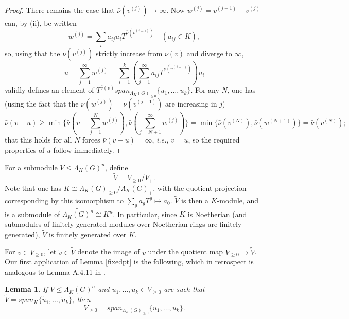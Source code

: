 \documentclass{amsart}
\theoremstyle{plain}
\newtheorem{lemma}[theorem]{Lemma}
\theoremstyle{definition}
\theoremstyle{remark}
\def\barnu{\bar{\nu}}
\begin{document}
\begin{proof}
There remains the case that $\barnu(v^{(j)})\to\infty$.    
  Now $w^{(j)}=v^{(j-1)}-v^{(j)}$
can, by (ii), be written \[ w^{(j)}=\sum_i a_{ij}u_iT^{\barnu(v^{(j-1)})}\quad (a_{ij}\in K),\] so, using that the $\barnu(v^{(j)})$ strictly increase from $\barnu(v)$ and diverge to $\infty$, \[ u=\sum_{j=1}^{\infty}w^{(j)}=\sum_{i=1}^{k}\left(\sum_{j=1}^{\infty}a_{ij}T^{\barnu(v^{(j-1)})}\right)u_i\]
validly defines an element of $T^{\barnu(v)}span_{\Lambda_K(G)_{\geq 0}}\{u_1,\ldots,u_k\}$.  For any $N$, one has (using the fact that the $\barnu(w^{(j)})=\barnu(v^{(j-1)})$ are increasing in $j$) \[ \barnu(v-u)\geq \min\{\barnu(v-\sum_{j=1}^{N}w^{(j)}),\barnu(\sum_{j=N+1}^{\infty}w^{(j)})\}=\min\{\barnu(v^{(N)}),\barnu(w^{(N+1)})\}=\barnu(v^{(N)});\] that this holds for all $N$ forces $\barnu(v-u)=\infty$, \emph{i.e.}, $v=u$, so the required properties of $u$ follow immediately.  
\end{proof}

For a submodule $V\leq \Lambda_K(G)^n$, define \[ \tilde{V}=V_{\geq 0}/V_+.\]  Note that one has $K\cong \Lambda_K(G)_{\geq 0}/\Lambda_K(G)_+$, with the quotient projection corresponding by this isomorphism to $\sum_g a_gT^g\mapsto a_0$.  $\tilde{V}$ is then a $K$-module, and is a submodule of $\widetilde{\Lambda_K(G)^n}\cong K^n$.  In particular, since $K$ is Noetherian (and submodules of finitely generated modules over Noetherian rings are finitely generated), $\tilde{V}$ is finitely generated over $K$.

For $v\in V_{\geq 0}$, let $\tilde{v}\in\tilde{V}$ denote the image of $v$ under the quotient map $V_{\geq 0}\to \tilde{V}$.  Our first application of Lemma \ref{fixedpt} is the following, which in retrospect is analogous to Lemma A.4.11 in \cite{FOOO}.

\begin{lemma} \label{span}If $V\leq \Lambda_K(G)^n$ and $u_1,\ldots,u_k\in V_{\geq 0}$ are such that $\tilde{V}=span_K\{\tilde{u}_1,\ldots,\tilde{u}_k\}$, then \[ V_{\geq 0}=span_{\Lambda_K(G)_{\geq 0}}\{u_1,\ldots,u_k\}.\]
\end{lemma}
\end{document}
